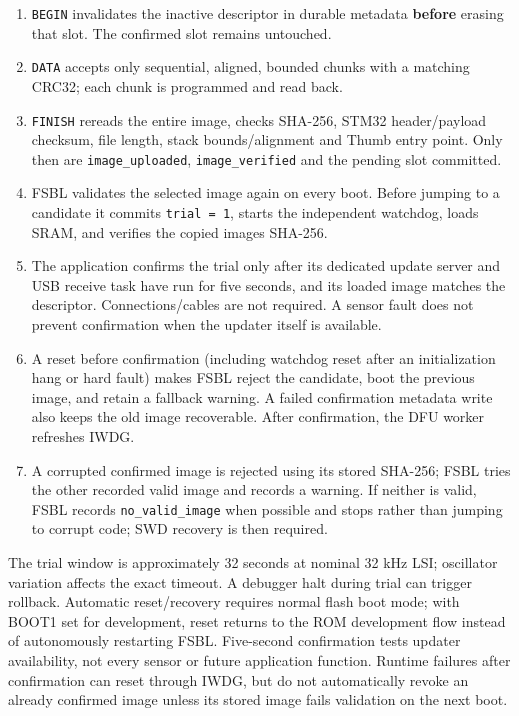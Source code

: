 \documentclass[10pt,a4paper,oneside]{report}
\providecommand{\tightlist}{\setlength{\itemsep}{1pt}\setlength{\parskip}{1pt}}
\begin{document}
\begin{enumerate}
\def\labelenumi{\arabic{enumi}.}
\tightlist
\item
  \texttt{BEGIN} invalidates the inactive descriptor in durable metadata \textbf{before} erasing that slot. The confirmed slot remains untouched.
\item
  \texttt{DATA} accepts only sequential, aligned, bounded chunks with a matching CRC32; each chunk is programmed and read back.
\item
  \texttt{FINISH} rereads the entire image, checks SHA-256, STM32 header/payload checksum, file length, stack bounds/alignment and Thumb entry point. Only then are \texttt{image\_\allowbreak{}uploaded}, \texttt{image\_\allowbreak{}verified} and the pending slot committed.
\item
  FSBL validates the selected image again on every boot. Before jumping to a candidate it commits \texttt{trial = 1}, starts the independent watchdog, loads SRAM, and verifies the copied image\textquotesingle s SHA-256.
\item
  The application confirms the trial only after its dedicated update server and USB receive task have run for five seconds, and its loaded image matches the descriptor. Connections/cables are not required. A sensor fault does not prevent confirmation when the updater itself is available.
\item
  A reset before confirmation (including watchdog reset after an initialization hang or hard fault) makes FSBL reject the candidate, boot the previous image, and retain a fallback warning. A failed confirmation metadata write also keeps the old image recoverable. After confirmation, the DFU worker refreshes IWDG.
\item
  A corrupted confirmed image is rejected using its stored SHA-256; FSBL tries the other recorded valid image and records a warning. If neither is valid, FSBL records \texttt{no\_\allowbreak{}valid\_\allowbreak{}image} when possible and stops rather than jumping to corrupt code; SWD recovery is then required.
\end{enumerate}

The trial window is approximately 32 seconds at nominal 32 kHz LSI; oscillator variation affects the exact timeout. A debugger halt during trial can trigger rollback. Automatic reset/recovery requires normal flash boot mode; with BOOT1 set for development, reset returns to the ROM development flow instead of autonomously restarting FSBL. Five-second confirmation tests updater availability, not every sensor or future application function. Runtime failures after confirmation can reset through IWDG, but do not automatically revoke an already confirmed image unless its stored image fails validation on the next boot.
\end{document}
